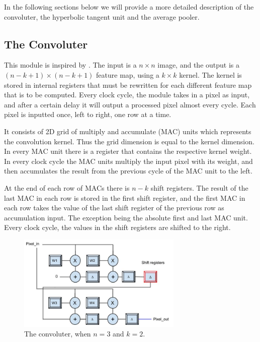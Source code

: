 In the following sections below we will provide a more detailed description of the convoluter, the hyperbolic tangent unit and the average pooler. 


\subsection{The Convoluter} \label{sec_convoluter}

This module is inspired by \cite{Farabet2009}. The input is a $ n \times n $ image, and the output is a $ (n-k+1) \times (n-k+1) $ feature map, using a $ k \times k $ kernel. The kernel is stored in internal registers that must be rewritten for each different feature map that is to be computed. Every clock cycle, the module takes in a pixel as input, and after a certain delay it will output a processed pixel almost every cycle. Each pixel is inputted once, left to right, one row at a time. 

It consists of 2D grid of multiply and accumulate (MAC) units which represents the convolution kernel. Thus the grid dimension is equal to the kernel dimension. In every MAC unit there is a register that contains the respective kernel weight. In every clock cycle the MAC units multiply the input pixel with its weight, and then accumulates the result from the previous cycle of the MAC unit to the left. 

At the end of each row of MACs there is $ n - k $ shift registers. The result of the last MAC in each row is stored in the first shift register, and the first MAC in each row takes the value of the last shift register of the previous row as accumulation input. The exception being the absolute first and last MAC unit. Every clock cycle, the values in the shift registers are shifted to the right. 

\begin{figure}[h!]
  \centering
      \includegraphics[width=0.7\textwidth]{Figures/Method/Convolver}
  \caption[The convoluter ]{The convoluter, when $ n = 3 $ and $ k = 2 $.}
\end{figure}
	
